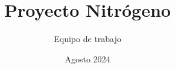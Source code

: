 \documentclass[letterpaper,12pt]{book}
\begin{document}
\author{Equipo de trabajo}
\title{Proyecto Nitrógeno}
\date{Agosto 2024}

\frontmatter
\maketitle
\tableofcontents

\mainmatter



\backmatter
\end{document}
